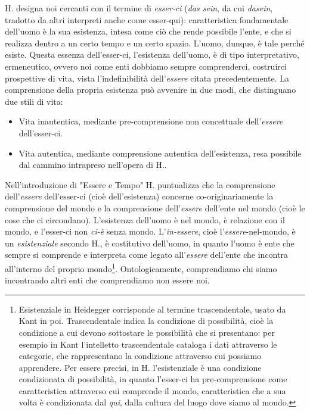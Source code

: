 \documentclass[a4paper,12pt,oneside]{article}%
\begin{document}
H. designa noi cercanti con il termine di \textit{esser-ci} (\textit{das sein}, da cui \textit{dasein}, tradotto da altri interpreti anche come esser-qui): caratteristica fondamentale dell’uomo è la sua esistenza, intesa come ciò che rende possibile l'ente, e che si realizza dentro a un certo tempo e un certo spazio. L’uomo, dunque, è tale perché esiste. Questa essenza dell'esser-ci, l'esistenza dell'uomo, è di tipo interpretativo, ermeneutico, ovvero noi come enti dobbiamo sempre comprenderci, costruirci prospettive di vita, vista l'indefinibilità dell'\textit{essere} citata precedentemente. La comprensione della propria esistenza può avvenire in due modi, che distinguano due stili di vita:

\begin{itemize}
	\item Vita inautentica, mediante pre-comprensione non concettuale dell'\textit{essere} dell'esser-ci.
	\item Vita autentica, mediante comprensione autentica dell'esistenza, resa possibile dal cammino intrapreso nell'opera di H..
\end{itemize} 
	
Nell'introduzione di "Essere e Tempo" H. puntualizza che la comprensione dell'\textit{essere} dell'esser-ci (cioè dell'esistenza) concerne co-originariamente la comprensione del mondo e la comprensione dell'\textit{essere} dell'ente  nel mondo (cioè le cose che ci circondano). L'esistenza dell'uomo è nel mondo, è relazione con il mondo, e l'esser-ci non \textit{ci-è} senza mondo. L'\textit{in-essere}, cioè l'\textit{essere}-nel-mondo, è un \textit{esistenziale} secondo H., è costitutivo dell'uomo, in quanto l'uomo è ente che sempre si comprende e interpreta come legato all'\textit{essere} dell'ente che incontra all'interno del proprio mondo\footnote{Esistenziale in Heidegger corrisponde al termine trascendentale, usato da Kant in poi. Trascendentale indica la condizione di possibilità, cioè la condizione a cui devono sottostare le possibilità che si presentano: per esempio in Kant l'intelletto trascendentale cataloga i dati attraverso le categorie, che rappresentano la condizione attraverso cui possiamo apprendere. Per essere precisi, in H. l'esistenziale è una condizione condizionata di possibilità, in quanto l'esser-ci ha pre-comprensione come caratteristica attraverso cui comprende il mondo, caratteristica che a sua volta è condizionata dal \textit{qui}, dalla cultura del luogo dove siamo al mondo.}. Ontologicamente, comprendiamo chi siamo incontrando altri enti che comprendiamo non essere noi.
\end{document}
